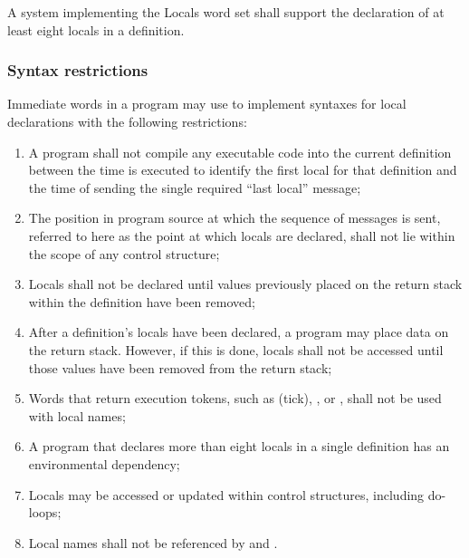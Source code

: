 A system implementing the Locals word set shall support the
declaration of at least eight locals in a definition.


\subsubsection{Syntax restrictions} %
\label{locals:rules}

Immediate words in a program may use  to implement
syntaxes for local declarations with the following restrictions:

\begin{enumerate}
\item A program shall not compile any executable code into the
	current definition between the time  is executed
	to identify the first local for that definition and the time of
	sending the single required ``last local'' message;

\item The position in program source at which the sequence of
	 messages is sent, referred to here as the point
	at which locals are declared, shall not lie within the scope of
	any control structure;

\item Locals shall not be declared until values previously placed on
	the return stack within the definition have been removed;

\item After a definition's locals have been declared, a program may
	place data on the return stack. However, if this is done,
	locals shall not be accessed until those values have been
	removed from the return stack;

\item Words that return execution tokens, such as 
	(tick), \word[core]{[']}, or , shall not be
	used with local names;

\item A program that declares more than eight locals in a single
	definition has an environmental dependency;

\item Locals may be accessed or updated within control structures,
	including do-loops;

\item Local names shall not be referenced by 
	and \word[core]{[COMPILE]}.
\end{enumerate}

